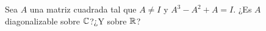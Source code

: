 \item Sea $A$ una matriz cuadrada tal que $A\neq I$ y $A^3-A^2+A=I$. ¿Es $A$ diagonalizable sobre $\mathbb{C}$?¿Y sobre $\mathbb{R}$?
    \begin{mdframed}[style=s]
        
    \end{mdframed}